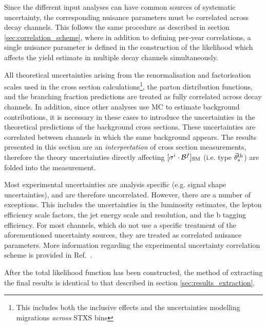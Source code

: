 Since the different input analyses can have common sources of systematic uncertainty, the corresponding nuisance parameters must be correlated across decay channels. This follows the same procedure as described in section \ref{sec:correlation_scheme}, where in addition to defining per-year correlations, a single nuisance parameter is defined in the construction of the likelihood which affects the yield estimate in multiple decay channels simultaneously. 

All theoretical uncertainties arising from the renormalisation and factorisation scales used in the cross section calculations\footnote{This includes both the inclusive effects and the uncertainties modelling migrations \textit{across} STXS bins}, the parton distribution functions, and the branching fraction predictions are treated as fully correlated across decay channels. In addition, since other analyses use MC to estimate background contributions, it is necessary in these cases to introduce the uncertainties in the theoretical predictions of the background cross sections. These uncertainties are correlated between channels in which the same background appears. The results presented in this section are an \textit{interpretation} of cross section measurements, therefore the theory uncertainties directly affecting $[\sigma^i \cdot \mathcal{B}^{f}]_{\rm{SM}}$ (i.e. type $\vec{\theta}_s^{\rm{th}}$) are folded into the measurement.

Most experimental uncertainties are analysis specific (e.g. \mgg signal shape uncertainties), and are therefore uncorrelated. However, there are a number of exceptions. This includes the uncertainties in the luminosity estimates, the lepton efficiency scale factors, the jet energy scale and resolution, and the b tagging efficiency. For most channels, which do not use a specific treatment of the aforementioned uncertainty sources, they are treated as correlated nuisance parameters. More information regarding the experimental uncertainty correlation scheme is provided in Ref.~\cite{CMS-PAS-HIG-19-005}.

After the total likelihood function has been constructed, the method of extracting the final results is identical to that described in section \ref{sec:results_extraction}.


